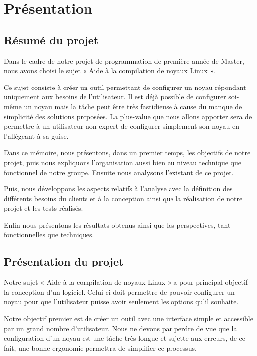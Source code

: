 \documentclass[16pts]{report}
\begin{document}

\nocite{*}

\chapter{Présentation}
\label{cha:Présentation}

\section{Résumé du projet}
\label{sec:Résumé du projet}

Dans le cadre de notre projet de programmation de première année de Master, nous avons choisi le sujet « Aide à la compilation de noyaux Linux ».

Ce sujet consiste à créer un outil permettant de configurer un noyau répondant uniquement aux besoins de l'utilisateur. Il est déjà possible de configurer soi-même un noyau mais la tâche peut être très fastidieuse à cause du manque de simplicité des solutions proposées. La plus-value que nous allons apporter sera de permettre à un utilisateur non expert de configurer simplement son noyau en l'allégeant à sa guise.

Dans ce mémoire, nous présentons, dans un premier temps, les objectifs de notre projet, puis nous expliquons l’organisation aussi bien au niveau technique que fonctionnel de notre groupe. Ensuite nous analysons l'existant de ce projet.

Puis, nous développons les aspects relatifs à l’analyse avec la définition des différents besoins du clients et à la conception ainsi que la réalisation de notre projet et les tests réalisés.

Enfin nous présentons les résultats obtenus ainsi que les perspectives, tant fonctionnelles que techniques.


\section{Présentation du projet}
\label{sec:Présentation du projet}

Notre sujet « Aide à la compilation de noyaux Linux » a pour principal objectif la conception d'un logiciel. Celui-ci doit permettre de pouvoir configurer un noyau pour que l'utilisateur puisse avoir seulement les options qu'il souhaite. 

Notre objectif premier est de créer un outil avec une interface simple et accessible par un grand nombre d'utilisateur. Nous ne devons par perdre de vue que la configuration d'un noyau est une tâche très longue et sujette aux erreurs, de ce fait, une bonne ergonomie permettra de simplifier ce processus.
\end{document}
